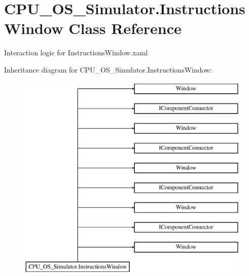 \hypertarget{class_c_p_u___o_s___simulator_1_1_instructions_window}{}\section{C\+P\+U\+\_\+\+O\+S\+\_\+\+Simulator.\+Instructions\+Window Class Reference}
\label{class_c_p_u___o_s___simulator_1_1_instructions_window}


Interaction logic for Instructions\+Window.\+xaml  


Inheritance diagram for C\+P\+U\+\_\+\+O\+S\+\_\+\+Simulator.\+Instructions\+Window\+:\begin{figure}[H]
\begin{center}
\leavevmode
\includegraphics[height=10.000000cm]{class_c_p_u___o_s___simulator_1_1_instructions_window}
\end{center}
\end{figure}

